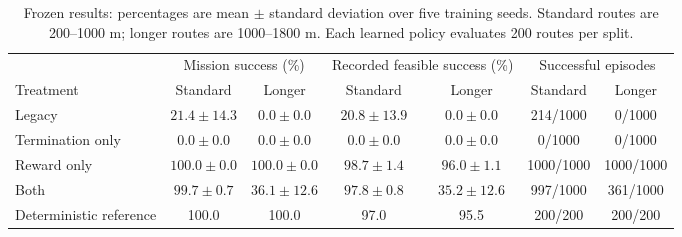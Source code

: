 \begin{table}[t]
\caption{Frozen results: percentages are mean $\pm$ standard deviation over five training seeds. Standard routes are 200--1000 m; longer routes are 1000--1800 m. Each learned policy evaluates 200 routes per split.}
\label{tab:results}\centering\footnotesize
\begin{tabular}{lcccccc}\toprule
 & \multicolumn{2}{c}{Mission success (\%)} & \multicolumn{2}{c}{Recorded feasible success (\%)} & \multicolumn{2}{c}{Successful episodes}\\
Treatment & Standard & Longer & Standard & Longer & Standard & Longer\\\midrule
Legacy & $21.4\pm14.3$ & $0.0\pm0.0$ & $20.8\pm13.9$ & $0.0\pm0.0$ & 214/1000 & 0/1000 \\
Termination only & $0.0\pm0.0$ & $0.0\pm0.0$ & $0.0\pm0.0$ & $0.0\pm0.0$ & 0/1000 & 0/1000 \\
Reward only & $100.0\pm0.0$ & $100.0\pm0.0$ & $98.7\pm1.4$ & $96.0\pm1.1$ & 1000/1000 & 1000/1000 \\
Both & $99.7\pm0.7$ & $36.1\pm12.6$ & $97.8\pm0.8$ & $35.2\pm12.6$ & 997/1000 & 361/1000 \\
Deterministic reference & 100.0 & 100.0 & 97.0 & 95.5 & 200/200 & 200/200 \\
\bottomrule\end{tabular}
\end{table}
